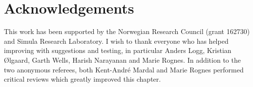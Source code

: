 \section{Acknowledgements}

This work has been supported by the Norwegian Research Council (grant
162730) and Simula \hbox{Research} Laboratory.  I wish to thank everyone who
has helped improving \ufl{} with suggestions and testing, in particular
Anders Logg, Kristian \O{}lgaard, Garth Wells, Harish Narayanan and Marie Rognes.
In addition to the two anonymous referees, both Kent-Andr\'e Mardal and Marie
Rognes performed critical reviews which greatly improved this chapter.


\processqueries

\endgroup

